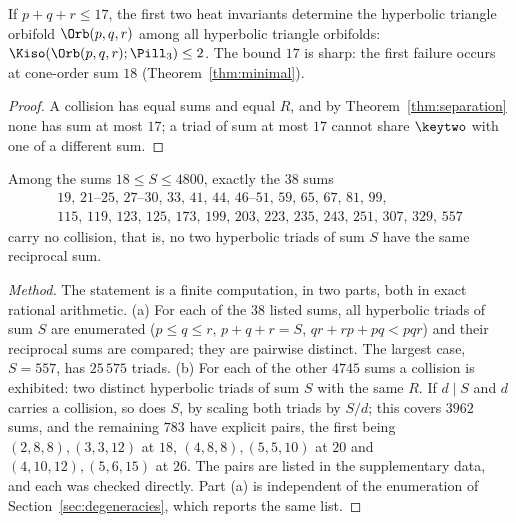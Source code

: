 %


\begin{theorem}\label{thm:threshold}
If $p+q+r\le17$, the first two heat invariants determine the hyperbolic triangle orbifold
$\Orb(p,q,r)$ among all hyperbolic triangle orbifolds: $\Kiso(\Orb(p,q,r);\Pill_3)\le2$. The bound
$17$ is sharp: the first failure occurs at cone-order sum $18$ (Theorem~\ref{thm:minimal}).
\end{theorem}

\begin{proof}
A collision has equal sums and equal $R$, and by Theorem~\ref{thm:separation} none has sum at most
$17$; a triad of sum at most $17$ cannot share $\keytwo$ with one of a different sum.
\end{proof}


\begin{proposition}\label{prop:collisionfree}
Among the sums $18\le S\le4800$, exactly the $38$ sums
\[
\begin{gathered}
  19,\,21\text{--}25,\,27\text{--}30,\,33,\,41,\,44,\,46\text{--}51,\,59,\,65,\,67,\,81,\,99,\\
  115,\,119,\,123,\,125,\,173,\,199,\,203,\,223,\,235,\,243,\,251,\,307,\,329,\,557
\end{gathered}
\]
carry no collision, that is, no two hyperbolic triads of sum $S$ have the same reciprocal sum.
\end{proposition}

\begin{proof}[Method]
The statement is a finite computation, in two parts, both in exact rational arithmetic.
(a) For each of the $38$ listed sums, all hyperbolic triads of sum $S$ are enumerated
($p\le q\le r$, $p+q+r=S$, $qr+rp+pq<pqr$) and their reciprocal sums are compared; they are pairwise
distinct. The largest case, $S=557$, has $25\,575$ triads.
(b) For each of the other $4745$ sums a collision is exhibited: two distinct hyperbolic triads of
sum $S$ with the same $R$. If $d\mid S$ and $d$ carries a collision, so does $S$, by scaling both
triads by $S/d$; this covers $3962$ sums, and the remaining $783$ have explicit pairs, the first
being $(2,8,8),(3,3,12)$ at $18$, $(4,8,8),(5,5,10)$ at $20$ and $(4,10,12),(5,6,15)$ at $26$. The
pairs are listed in the supplementary data, and each was checked directly.
Part (a) is independent of the enumeration of Section~\ref{sec:degeneracies}, which reports the
same list.
\end{proof}

